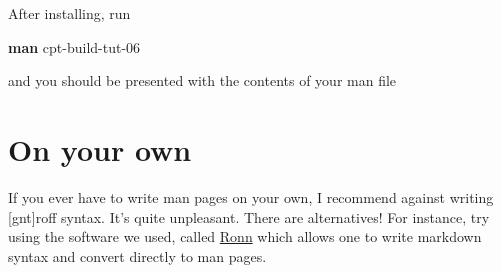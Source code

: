 \documentclass[]{article}
\newenvironment{Shaded}{}{}
\newcommand{\KeywordTok}[1]{\textcolor[rgb]{0.00,0.44,0.13}{\textbf{{#1}}}}
\newcommand{\NormalTok}[1]{{#1}}
\begin{document}
After installing, run

\begin{Shaded}
\begin{Highlighting}[]
\KeywordTok{man} \NormalTok{cpt-build-tut-06}
\end{Highlighting}
\end{Shaded}
and you should be presented with the contents of your man file

\section{On your own}

If you ever have to write man pages on your own, I recommend against
writing {[}gnt{]}roff syntax. It's quite unpleasant. There are
alternatives! For instance, try using the software we used, called
\href{http://rtomayko.github.io/ronn/}{Ronn} which allows one to write
markdown syntax and convert directly to man pages.
\end{document}
